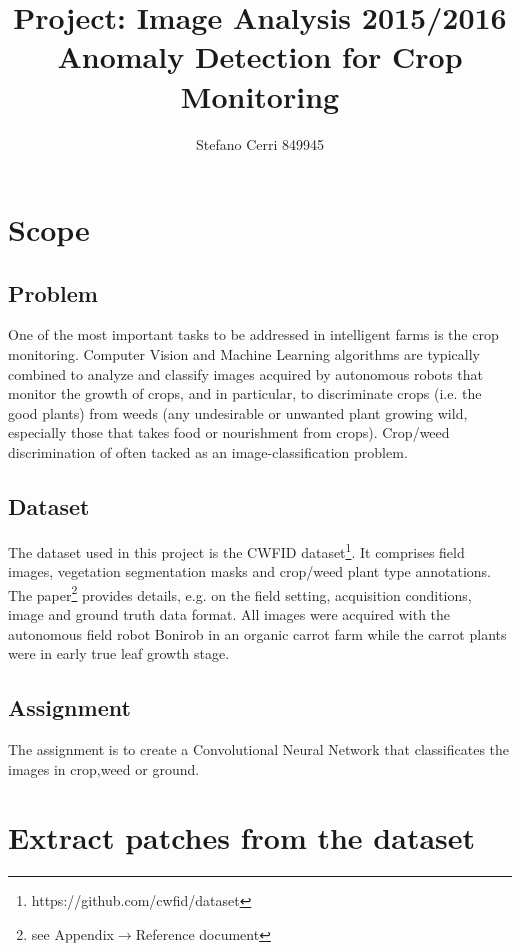\documentclass[]{report}
\title{Project: Image Analysis 2015/2016\\Anomaly Detection for Crop Monitoring}
\author{Stefano Cerri 849945}
\begin{document}
\maketitle
\tableofcontents
\listoffigures

\chapter{Scope}

\section{Problem}

One of the most important tasks to be addressed in intelligent farms is the crop monitoring. Computer Vision and Machine Learning algorithms are typically combined to analyze and classify images acquired by autonomous robots that monitor the growth of crops, and in particular, to discriminate crops (i.e. the good plants) from weeds (any undesirable or unwanted plant growing wild, especially those that takes food or nourishment from crops). Crop/weed discrimination of often tacked as an image-classification problem.


\section{Dataset}

The dataset used in this project is the CWFID dataset\footnote{https://github.com/cwfid/dataset}. It comprises field images, vegetation segmentation masks and crop/weed plant type annotations. The paper\footnote{see Appendix$\rightarrow  $Reference document} provides details, e.g. on the field setting, acquisition conditions, image and ground truth data format.
All images were acquired with the autonomous field robot Bonirob in an organic carrot farm while the carrot plants were in early true leaf growth stage.

\section{Assignment}

The assignment is to create a Convolutional Neural Network that classificates the images in crop,weed or ground. 

\chapter{Extract patches from the dataset}
\end{document}
